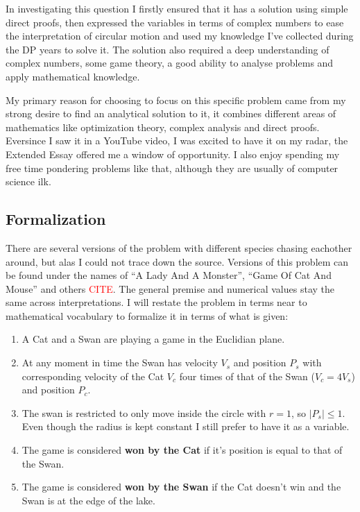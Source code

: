 \documentclass[12pt]{article}
\begin{document}
In investigating this question I firstly ensured that it has a solution using simple direct proofs, then expressed the variables in terms of complex numbers to ease the interpretation of circular motion and used my knowledge I've collected during the DP years to solve it. The solution also required a deep understanding of complex numbers, some game theory, a good ability to analyse problems and apply mathematical knowledge. 

My primary reason for choosing to focus on this specific problem came from my strong desire to find an analytical solution to it, it combines different areas of mathematics like optimization theory, complex analysis and direct proofs. Eversince I saw it in a YouTube video\citep{Catandmouse}, I was excited to have it on my radar, the Extended Essay offered me a window of opportunity. I also enjoy spending my free time pondering problems like that, although they are usually of computer science ilk.

\subsection{Formalization}
There are several versions of the problem with different species chasing eachother around, but alas I could not trace down the source. Versions of this problem can be found under the names of ``A Lady And A Monster''\citep{ladyandmonster}, ``Game Of Cat And Mouse''\citep{Catandmouse} and others 
\textcolor{red}{CITE}. The general premise and numerical values stay the same across interpretations. I will restate the problem in terms near to mathematical vocabulary to formalize it in terms of what is given:

\begin{enumerate}
	\item A Cat and a Swan are playing a game in the Euclidian plane\cite{euclidianplane}. 
	\item At any moment in time the Swan has velocity $V_s$ and position $P_s$ with corresponding velocity of the Cat $V_c$ four times of that of the Swan ($V_c = 4V_s$) and position $P_c$.
	\item The swan is restricted to only move inside the circle with $r = 1$, so $|P_s| \leq 1$. Even though the radius is kept constant I still prefer to have it as a variable.
	\item The game is considered \textbf{won by the Cat} if it's position is equal to that of the Swan.
	\item The game is considered \textbf{won by the Swan} if the Cat doesn't win and the Swan is at the edge of the lake.
\end{enumerate}
\end{document}
